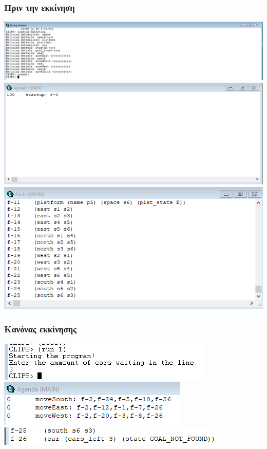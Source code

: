 \documentclass{article}
\begin{document}
    \subsubsection{Πριν την εκκίνηση}
    \includegraphics[scale=0.5]{images/dialog_window_b1_1.png}
    \includegraphics[scale=0.5]{images/agenda_window_b1_1.png}
    \includegraphics[scale=0.5]{images/facts_window_b1_1.png}

    \newpage
    \subsubsection{Κανόνας εκκίνησης}
    \includegraphics[scale=0.5]{images/dialog_window_b1_2.png}
    \includegraphics[scale=0.5]{images/agenda_window_b1_2.png}
    \includegraphics[scale=0.5]{images/facts_window_b1_2.png}
\end{document}
